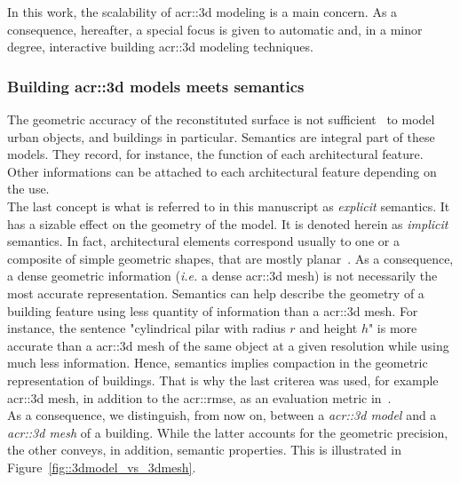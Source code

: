             In this work, the scalability of \gls{acr::3d} modeling is a main concern.
            As a consequence, hereafter, a special focus is given to automatic and, in a minor degree, interactive building \gls{acr::3d} modeling techniques.

        \subsubsection{Building \gls*{acr::3d} models meets semantics}
            The geometric accuracy of the reconstituted surface is not sufficient~\parencite{biljecki2016improved} to model urban objects, and buildings in particular.
            Semantics are integral part of these models.
            They record, for instance, the function of each architectural feature.
            Other informations can be attached to each architectural feature depending on the use.\\
            The last concept is what is referred to in this manuscript as \textit{explicit} semantics.
            It has a sizable effect on the geometry of the model.
            It is denoted herein as \textit{implicit} semantics.
            In fact, architectural elements correspond usually to one or a composite of simple geometric shapes, that are mostly planar~\parencite{kolbe2005citygml}.
            As a consequence, a dense geometric information (\textit{i.e.} a dense \gls{acr::3d} mesh) is not necessarily the most accurate representation.
            Semantics can help describe the geometry of a building feature using less quantity of information than a \gls{acr::3d} mesh.
            For instance, the sentence "cylindrical pilar with radius $r$ and height $h$" is more accurate than a \gls{acr::3d} mesh of the same object at a given resolution while using much less information.
            Hence, semantics implies compaction in the geometric representation of buildings.
            That is why the last criterea was used, for example \gls{acr::3d} mesh, in addition to the \gls{acr::rmse}, as an evaluation metric in~\textcite{lafarge_ijcv12}.\\
            As a consequence, we distinguish, from now on, between a \textit{\gls{acr::3d} model} and a \textit{\gls{acr::3d} mesh} of a building.
            While the latter accounts for the geometric precision, the other conveys, in addition, semantic properties.
            This is illustrated in Figure~\ref{fig::3dmodel_vs_3dmesh}.\\

